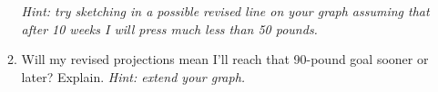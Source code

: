 \begin{enumerate}
\begin{enumerate}
 \emph{Hint:  try sketching in a possible revised line on your graph assuming that after 10 weeks I will press much less than 50 pounds.} \vfill
\item Will my revised projections mean I'll reach that 90-pound goal sooner or later?  Explain.  \emph{Hint: extend your graph.} \vfill
\end{enumerate}

\end{enumerate}

